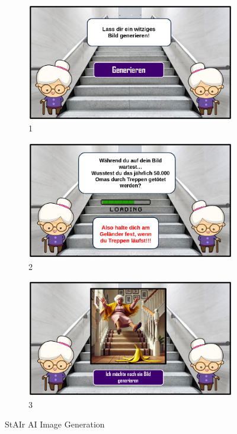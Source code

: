 \documentclass{article}
\begin{document}
\begin{figure}[H]
    \centering
    \begin{subfigure}[H]{0.8\textwidth}
        \centering
        \includegraphics[width=\textwidth]{./resources/StairImgAI_1.png}
        \caption{1}
    \end{subfigure}
    \hfill
    \begin{subfigure}[H]{0.8\textwidth}
        \centering
        \includegraphics[width=\textwidth]{./resources/StairImgAI_2.png}
        \caption{2}
    \end{subfigure}
    \hfill
    \begin{subfigure}[H]{0.8\textwidth}
        \centering
        \includegraphics[width=\textwidth]{./resources/StairImgAI_3.png}
        \caption{3}
    \end{subfigure}
    \caption{StAIr AI Image Generation}
    \label{fig:StairImgAI}
\end{figure}
\end{document}
